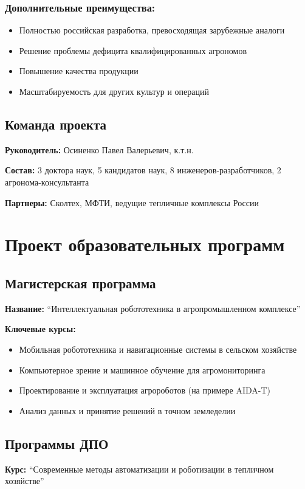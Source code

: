 \documentclass[12pt,a4paper]{article}
\begin{document}
\subsubsection{Дополнительные преимущества:}
\begin{itemize}
    \item Полностью российская разработка, превосходящая зарубежные аналоги
    \item Решение проблемы дефицита квалифицированных агрономов
    \item Повышение качества продукции
    \item Масштабируемость для других культур и операций
\end{itemize}

\subsection{Команда проекта}
\textbf{Руководитель:} Осиненко Павел Валерьевич, к.т.н.

\textbf{Состав:} 3 доктора наук, 5 кандидатов наук, 8 инженеров-разработчиков, 2 агронома-консультанта

\textbf{Партнеры:} Сколтех, МФТИ, ведущие тепличные комплексы России

\section{Проект образовательных программ}

\subsection{Магистерская программа}
\textbf{Название:} ``Интеллектуальная робототехника в агропромышленном комплексе''

\textbf{Ключевые курсы:}
\begin{itemize}
    \item Мобильная робототехника и навигационные системы в сельском хозяйстве
    \item Компьютерное зрение и машинное обучение для агромониторинга
    \item Проектирование и эксплуатация агророботов (на примере AIDA-T)
    \item Анализ данных и принятие решений в точном земледелии
\end{itemize}

\subsection{Программы ДПО}
\textbf{Курс:} ``Современные методы автоматизации и роботизации в тепличном хозяйстве''
\end{document}
